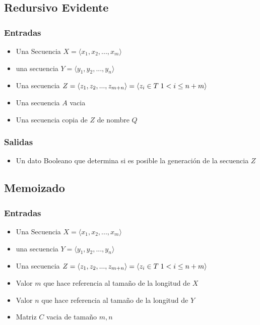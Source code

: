 \documentclass[]{article}
\numberwithin{equation}{section}
\numberwithin{figure}{section}
\theoremstyle{definition}
\begin{document}
\subsection*{Redursivo Evidente}

\subsubsection*{Entradas}

\begin{itemize}

\item Una Secuencia $X=\langle x_1,x_2,...,x_m \rangle$
\item una secuencia $Y=\langle y_1,y_2,...,y_n \rangle$  
\item Una secuencia $Z=\langle z_1,z_2,...,z_{m+n} \rangle = \langle z_i \in T \hspace{1mm} 1<i \leq n+m \rangle$
\item Una secuencia $A$ vacia
\item Una secuencia copia de $Z$ de nombre $Q$

\end{itemize}

\subsubsection*{Salidas}

\begin{itemize}

\item Un dato Booleano que determina si es posible la generación de la secuencia $Z$

\end{itemize}

\subsection*{Memoizado}

\subsubsection*{Entradas}

\begin{itemize}

\item Una Secuencia $X=\langle x_1,x_2,...,x_m \rangle$
\item una secuencia $Y=\langle y_1,y_2,...,y_n \rangle$  
\item Una secuencia $Z=\langle z_1,z_2,...,z_{m+n} \rangle = \langle z_i \in T \hspace{1mm} 1<i \leq n+m \rangle$
\item Valor $m$ que hace referencia al tamaño de la longitud de $X$
\item Valor $n$ que hace referencia al tamaño de la longitud de $Y$
\item Matriz $C$ vacia de tamaño $m,n$

\end{itemize}
\end{document}
